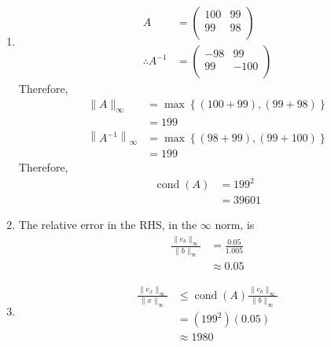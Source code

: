 \documentclass[fleqn, a4paper, 11pt, oneside]{amsart}
\theoremstyle{definition}
\theoremstyle{theorem}
\DeclareMathOperator{\cond}{cond}
\begin{document}
\begin{solution}
	\begin{enumerate}[leftmargin=*]
		\item
			\begin{align*}
				A &=
					\begin{pmatrix}
						100 & 99 \\
						99  & 98 \\
					\end{pmatrix}\\
				\therefore A^{-1} &=
					\begin{pmatrix}
						-98 & 99   \\
						99  & -100 \\
					\end{pmatrix}
			\end{align*}
			Therefore,
			\begin{align*}
				\|A\|_{\infty}                   & = \max\left\{ (100 + 99) , (99 + 98) \right\} \\
                                                                 & = 199                                         \\
				\left\| A^{-1} \right\|_{\infty} & = \max\left\{ (98 + 99) , (99 + 100) \right\} \\
                                                                 & = 199
			\end{align*}
			Therefore,
			\begin{align*}
				\cond(A) & = 199^2 \\
                                         & = 39601
			\end{align*}
		\item
			The relative error in the RHS, in the $\infty$ norm, is
			\begin{align*}
				\frac{\|e_b\|_{\infty}}{\|b\|_{\infty}} & = \frac{0.05}{1.005} \\
                                                                        & \approx 0.05
			\end{align*}
		\item
			\begin{align*}
				\frac{\|e_x\|_{\infty}}{\|x\|_{\infty}} & \le \cond(A) \frac{\|e_b\|_{\infty}}{\|b\|_{\infty}} \\
                                                                        & = \left( 199^2 \right) \left( 0.05 \right)           \\
                                                                        & \approx 1980

\end{align*}
\end{enumerate}
\end{solution}
\end{document}
